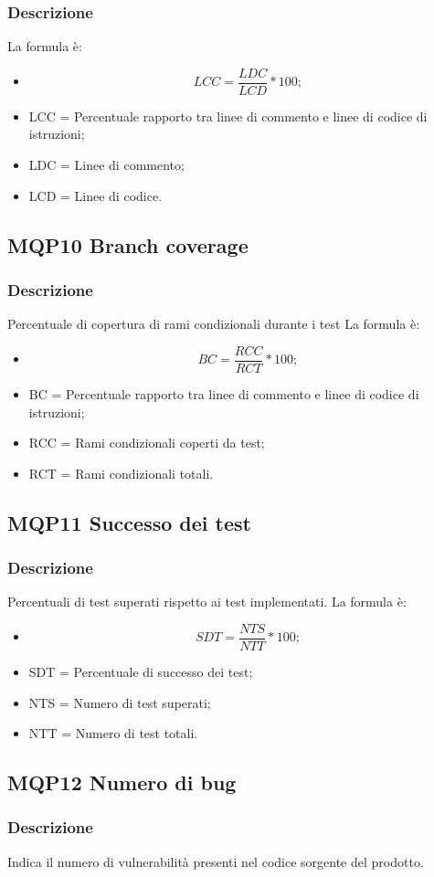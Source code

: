 \documentclass[a4paper]{article}
\begin{document}
\subsubsection{Descrizione}
La formula è:
\begin{itemize}
  \item \[LCC = \frac{LDC}{LCD} * 100 ;\]
  \item LCC = Percentuale rapporto tra linee di commento e linee di codice di istruzioni;
  \item LDC = Linee di commento;
  \item LCD = Linee di codice.
  \end{itemize}

\subsection{MQP10 Branch coverage}
\subsubsection{Descrizione}
Percentuale di copertura di rami condizionali durante i test
La formula è:
\begin{itemize}
  \item \[BC = \frac{RCC}{RCT} * 100 ;\]
  \item BC = Percentuale rapporto tra linee di commento e linee di codice di istruzioni;
  \item RCC = Rami condizionali coperti da test;
  \item RCT = Rami condizionali totali.
  \end{itemize}


\subsection{MQP11 Successo dei test}
\subsubsection{Descrizione}
Percentuali di test superati rispetto ai test implementati.
La formula è:
\begin{itemize}
  \item \[SDT = \frac{NTS}{NTT} * 100 ;\]
  \item SDT = Percentuale di successo dei test;
  \item NTS = Numero di test superati;
  \item NTT = Numero di test totali.
  \end{itemize}

\subsection{MQP12 Numero di bug}
\subsubsection{Descrizione}
Indica il numero di vulnerabilità presenti nel codice sorgente del prodotto.
\end{document}
